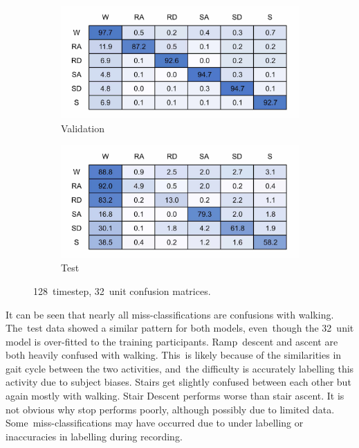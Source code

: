\begin{figure}[!hbt]
    \centering
    \begin{subfigure}{.45\textwidth}
        \centering
        \includegraphics[width=\textwidth]{content/4-LSTM_Behaviour/results/conf_matricies/Training_128x32_NT.jpg}
	  \caption{Validation}
        \label{fig:full_model_conf_matrix_training_128x32}
    \end{subfigure}
    \begin{subfigure}{.45\textwidth}
        \centering
        \includegraphics[width=\textwidth]{content/4-LSTM_Behaviour/results/conf_matricies/Test_128x32_NT.jpg}
	 \caption{Test}
        \label{fig:full_model_conf_matrix_test_128x32}
    \end{subfigure}
    \caption{128~timestep, 32~unit confusion matrices.}
    \label{fig:128x32_full_model_confusion_matrix}
\end{figure}

It can be seen that nearly all miss-classifications are confusions with walking. The~test data showed a similar pattern for both models, even~though the 32~unit model is over-fitted to the training participants. Ramp~descent and ascent are both heavily confused with walking. This~is likely because of the similarities in gait cycle between the two activities, and~the difficulty is accurately labelling this activity due to subject biases. Stairs get slightly confused between each other but again mostly with walking. Stair Descent performs worse than stair ascent. It is not obvious why stop performs poorly, although possibly due to limited data. Some~miss-classifications may have occurred due to under labelling or inaccuracies in labelling during recording.

